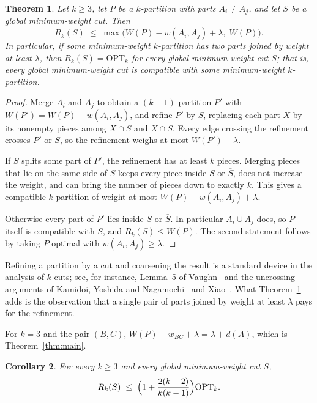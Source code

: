 \documentclass[preprint,12pt]{elsarticle}
\newtheorem{theorem}{Theorem}
\newtheorem{corollary}[theorem]{Corollary}
\theoremstyle{definition}
\newcommand{\OPT}{\mathrm{OPT}}
\newcommand{\Sbar}{\overline{S}}
\begin{document}
\begin{theorem}\label{thm:kcut}
Let $k\ge3$, let $P$ be a $k$-partition with parts $A_i\ne A_j$, and let $S$ be a global minimum-weight
cut. Then
\[
  R_k(S)\;\le\;\max\bigl(W(P)-w(A_i,A_j)+\lambda,\;W(P)\bigr).
\]
In particular, if some minimum-weight $k$-partition has two parts joined by weight at least $\lambda$,
then $R_k(S)=\OPT_k$ for every global minimum-weight cut $S$; that is, every global minimum-weight cut
is compatible with some minimum-weight $k$-partition.
\end{theorem}

\begin{proof}
Merge $A_i$ and $A_j$ to obtain a $(k-1)$-partition $P'$ with $W(P')=W(P)-w(A_i,A_j)$, and refine $P'$
by $S$, replacing each part $X$ by its nonempty pieces among $X\cap S$ and $X\cap\Sbar$. Every edge
crossing the refinement crosses $P'$ or $S$, so the refinement weighs at most $W(P')+\lambda$.

If $S$ splits some part of $P'$, the refinement has at least $k$ pieces. Merging pieces that lie on
the same side of $S$ keeps every piece inside $S$ or $\Sbar$, does not increase the weight, and can
bring the number of pieces down to exactly $k$. This gives a compatible $k$-partition of weight at most
$W(P)-w(A_i,A_j)+\lambda$.

Otherwise every part of $P'$ lies inside $S$ or $\Sbar$. In particular $A_i\cup A_j$ does, so $P$
itself is compatible with $S$, and $R_k(S)\le W(P)$. The second statement follows by taking $P$ optimal
with $w(A_i,A_j)\ge\lambda$.
\end{proof}

Refining a partition by a cut and coarsening the result is a standard device in the analysis of
$k$-cuts; see, for instance, Lemma~5 of Vaughn~\cite{Vaughn2026} and the uncrossing arguments of
Kamidoi, Yoshida and Nagamochi~\cite{KamidoiYoshidaNagamochi2007} and Xiao~\cite{Xiao2008kway}.
What Theorem~\ref{thm:kcut} adds is the observation that a single pair of parts joined by weight at
least $\lambda$ pays for the refinement.

For $k=3$ and the pair $(B,C)$, $W(P)-w_{BC}+\lambda=\lambda+d(A)$, which is
Theorem~\ref{thm:main}.

\begin{corollary}\label{cor:kapprox}
For every $k\ge3$ and every global minimum-weight cut $S$,
\[
  R_k(S)\;\le\;\Bigl(1+\frac{2(k-2)}{k(k-1)}\Bigr)\OPT_k .
\]
\end{corollary}
\end{document}
